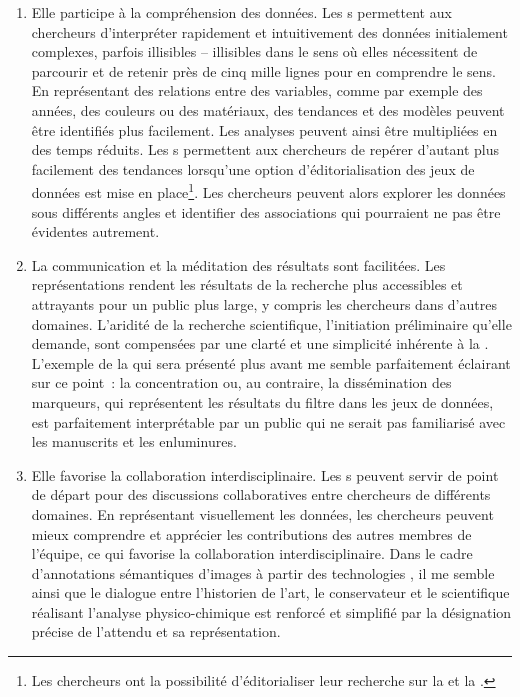 \begin{enumerate}
	\item Elle participe à la compréhension des données. Les s permettent aux chercheurs d’interpréter rapidement et intuitivement des données initialement complexes, parfois illisibles – illisibles dans le sens où elles nécessitent de parcourir et de retenir près de cinq mille lignes pour en comprendre le sens. En représentant des relations entre des variables, comme par exemple des années, des couleurs ou des matériaux, des tendances et des modèles peuvent être identifiés plus facilement. Les analyses peuvent ainsi être multipliées en des temps réduits. Les s permettent aux chercheurs de repérer d’autant plus facilement des tendances lorsqu’une option d’éditorialisation des jeux de données est mise en place\footnote{Les chercheurs ont la possibilité d’éditorialiser leur recherche sur la  et la .}. Les chercheurs peuvent alors explorer les données sous différents angles et identifier des associations qui pourraient ne pas être évidentes autrement.
	\item La communication et la méditation des résultats sont facilitées. Les représentations rendent les résultats de la recherche plus accessibles et attrayants pour un public plus large, y compris les chercheurs dans d'autres domaines. L’aridité de la recherche scientifique, l’initiation préliminaire qu’elle demande, sont compensées par une clarté et une simplicité inhérente à la . L’exemple de la  qui sera présenté plus avant me semble parfaitement éclairant sur ce point~: la concentration ou, au contraire, la dissémination des marqueurs, qui représentent les résultats du filtre dans les jeux de données, est parfaitement interprétable par un public qui ne serait pas familiarisé avec les manuscrits et les enluminures.
	\item Elle favorise la collaboration interdisciplinaire. Les s peuvent servir de point de départ pour des discussions collaboratives entre chercheurs de différents domaines. En représentant visuellement les données, les chercheurs peuvent mieux comprendre et apprécier les contributions des autres membres de l'équipe, ce qui favorise la collaboration interdisciplinaire. Dans le cadre d’annotations sémantiques d’images à partir des technologies , il me semble ainsi que le dialogue entre l’historien de l’art, le conservateur et le scientifique réalisant l’analyse physico-chimique est renforcé et simplifié par la désignation précise de l’attendu et sa représentation.
\end{enumerate} \par

